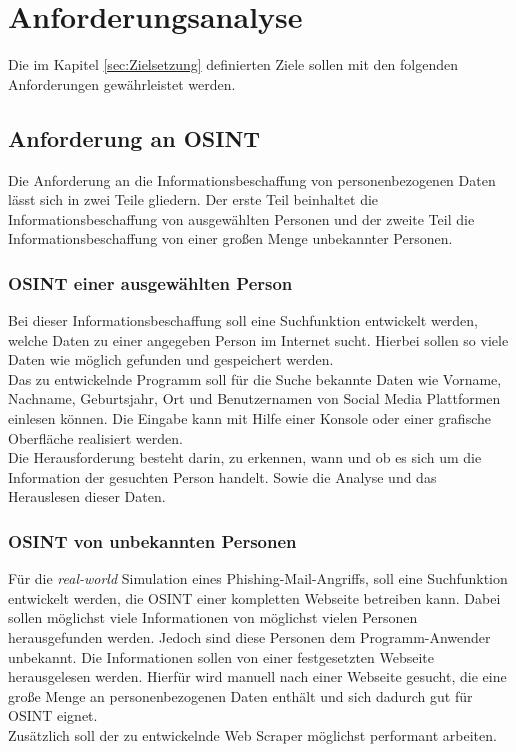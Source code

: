 
\chapter{Anforderungsanalyse}  %
\label{cha:Anforderungsanalyse und Prioriesierung} %
Die im Kapitel \ref{sec:Zielsetzung} definierten Ziele sollen mit den folgenden Anforderungen gewährleistet werden.

\section{Anforderung an OSINT}
Die Anforderung an die Informationsbeschaffung von personenbezogenen Daten lässt sich in zwei Teile gliedern. Der erste Teil beinhaltet die Informationsbeschaffung von ausgewählten Personen und der zweite Teil die Informationsbeschaffung von einer großen Menge unbekannter Personen.
	
	\subsection{OSINT einer ausgewählten Person}
	Bei dieser Informationsbeschaffung soll eine Suchfunktion entwickelt werden, welche Daten zu einer angegeben Person im Internet sucht. Hierbei sollen so viele Daten wie möglich gefunden und gespeichert werden.\\
	Das zu entwickelnde Programm soll für die Suche bekannte Daten wie Vorname, Nachname, Geburtsjahr, Ort und Benutzernamen von Social Media Plattformen einlesen können. Die Eingabe kann mit Hilfe einer Konsole oder einer grafische Oberfläche realisiert werden.\\
	Die Herausforderung besteht darin, zu erkennen, wann und ob es sich um die Information der gesuchten Person handelt. Sowie die Analyse und das Herauslesen dieser Daten.
	
	\subsection{OSINT von unbekannten Personen}
	Für die \textit{real-world} Simulation eines Phishing-Mail-Angriffs, soll eine Suchfunktion entwickelt werden, die OSINT einer kompletten Webseite betreiben kann. Dabei sollen möglichst viele Informationen von möglichst vielen Personen herausgefunden werden. Jedoch sind diese Personen dem Programm-Anwender unbekannt. Die Informationen sollen von einer festgesetzten Webseite herausgelesen werden. Hierfür wird manuell nach einer Webseite gesucht, die eine große Menge an personenbezogenen Daten enthält und sich dadurch gut für OSINT eignet.\\
	Zusätzlich soll der zu entwickelnde Web Scraper möglichst performant arbeiten.
		
